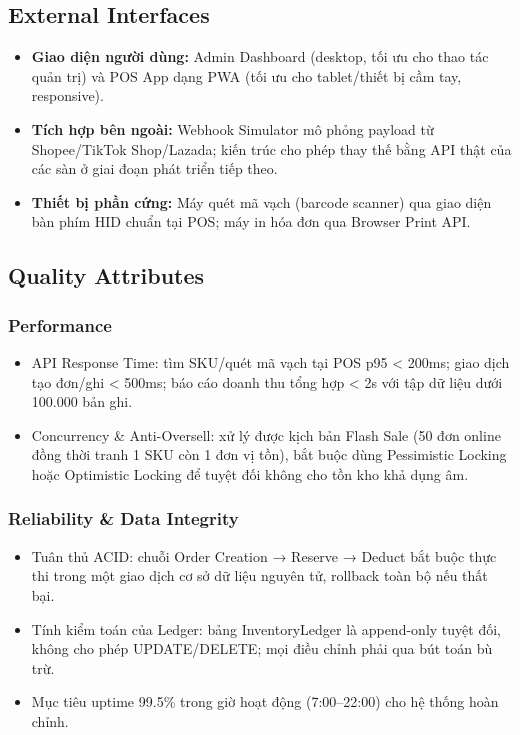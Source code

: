 \subsection{External Interfaces}
\begin{itemize}
    \item \textbf{Giao diện người dùng:} Admin Dashboard (desktop, tối ưu cho thao tác quản trị) và POS App dạng PWA (tối ưu cho tablet/thiết bị cầm tay, responsive).
    \item \textbf{Tích hợp bên ngoài:} Webhook Simulator mô phỏng payload từ Shopee/TikTok Shop/Lazada; kiến trúc cho phép thay thế bằng API thật của các sàn ở giai đoạn phát triển tiếp theo.
    \item \textbf{Thiết bị phần cứng:} Máy quét mã vạch (barcode scanner) qua giao diện bàn phím HID chuẩn tại POS; máy in hóa đơn qua Browser Print API.
\end{itemize}

\subsection{Quality Attributes}

\subsubsection{Performance}
\begin{itemize}
    \item API Response Time: tìm SKU/quét mã vạch tại POS p95 < 200ms; giao dịch tạo đơn/ghi < 500ms; báo cáo doanh thu tổng hợp < 2s với tập dữ liệu dưới 100.000 bản ghi.
    \item Concurrency \& Anti-Oversell: xử lý được kịch bản Flash Sale (50 đơn online đồng thời tranh 1 SKU còn 1 đơn vị tồn), bắt buộc dùng Pessimistic Locking hoặc Optimistic Locking để tuyệt đối không cho tồn kho khả dụng âm.
\end{itemize}

\subsubsection{Reliability \& Data Integrity}
\begin{itemize}
    \item Tuân thủ ACID: chuỗi Order Creation → Reserve → Deduct bắt buộc thực thi trong một giao dịch cơ sở dữ liệu nguyên tử, rollback toàn bộ nếu thất bại.
    \item Tính kiểm toán của Ledger: bảng InventoryLedger là append-only tuyệt đối, không cho phép UPDATE/DELETE; mọi điều chỉnh phải qua bút toán bù trừ.
    \item Mục tiêu uptime 99.5\% trong giờ hoạt động (7:00--22:00) cho hệ thống hoàn chỉnh.
\end{itemize}

